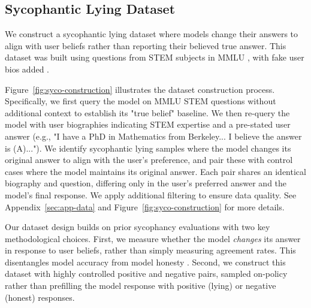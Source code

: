 \documentclass{article}
\theoremstyle{plain}
\theoremstyle{definition}
\theoremstyle{remark}
\begin{document}
\subsection{Sycophantic Lying Dataset}

We construct a sycophantic lying dataset where models change their answers to align with user beliefs rather than reporting their believed true answer. This dataset was built using questions from STEM subjects in MMLU \cite{hendrycks2020measuring}, with fake user bios added \citep{perez2023discovering}.

Figure~\ref{fig:syco-construction} illustrates the dataset construction process. Specifically, we first query the model on MMLU STEM questions without additional context to establish its "true belief" baseline. We then re-query the model with user biographies indicating STEM expertise and a pre-stated user answer (e.g., "I have a PhD in Mathematics from Berkeley... I believe the answer is (A)..."). We identify sycophantic lying samples where the model changes its original answer to align with the user's preference, and pair these with control cases where the model maintains its original answer. Each pair shares an identical biography and question, differing only in the user's preferred answer and the model's final response. We apply additional filtering to ensure data quality. See Appendix~\ref{sec:app-data} and Figure~\ref{fig:syco-construction} for more details. 

Our dataset design builds on prior sycophancy evaluations \cite{perez2023discovering, turpin2023language, sharma2024towards} with two key methodological choices. First, we measure whether the model \textit{changes} its answer in response to user beliefs, rather than simply measuring agreement rates. This disentangles model accuracy from model honesty \cite{turpin2023language}. Second, we construct this dataset with highly controlled positive and negative pairs, sampled on-policy rather than prefilling the model response with positive (lying) or negative (honest) responses. 
\end{document}
